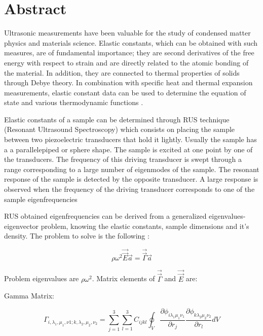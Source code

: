 \documentclass[12pt]{article}
\begin{document}
\section{Abstract}
Ultrasonic measurements have been valuable for the study of condensed matter physics and materials science. Elastic constants, which can be obtained with such measures, are of fundamental importance; they are second derivatives of the free energy with respect to strain and are directly related to the atomic bonding of the material. In addition, they are connected to thermal properties of solids through Debye theory. In combination with specific heat and thermal expansion measurements, elastic constant data can be used to determine the equation of state and various thermodynamic functions \cite{Leisure_1997}.

Elastic constants of a sample can be determined through RUS technique (Resonant Ultrasound Spectroscopy) which consists on placing the sample between two piezoelectric transducers that hold it lightly. Usually the sample has a a parallelepiped or sphere shape. The sample is excited at one point by one of the transducers. The frequency of this driving transducer is swept through a range corresponding to a large number of eigenmodes of the sample. The resonant response of the sample is detected by the opposite transducer. A large response is observed when the frequency of the driving transducer corresponds to one of the sample eigenfrequencies \cite{Leisure_1997}

RUS obtained eigenfrequencies can be derived from a generalized eigenvalues-eigenvector problem, knowing the elastic constants, sample dimensions and it's density. The problem to solve is the following \cite{Leisure_1997}:

\begin{equation}
    \rho \omega^2 \vec{\vec{E}} \vec{a} = \vec{\vec{\Gamma}} \vec{a} 
\end{equation}

Problem eigenvalues are $\rho \omega^2$. Matrix elements of $\vec{\vec{\Gamma}}$ and $\vec{\vec{E}}$ are: 

Gamma Matrix: 

\begin{equation}
    \Gamma_{i, \lambda_1, \mu_1,  \nu1; k, \lambda_2, \mu_2, \nu_2} = \sum_{j=1}^{3} \sum_{l=1}^{3} {C_{ijkl} \oint_{V}{\frac{\partial \phi_{i \lambda_{1} \mu_1 \nu_1}}{\partial r_j} \frac{\partial \phi_{k \lambda_2 \mu_2 \nu_2}}{\partial r_l} dV}}
\end{equation}
\end{document}
